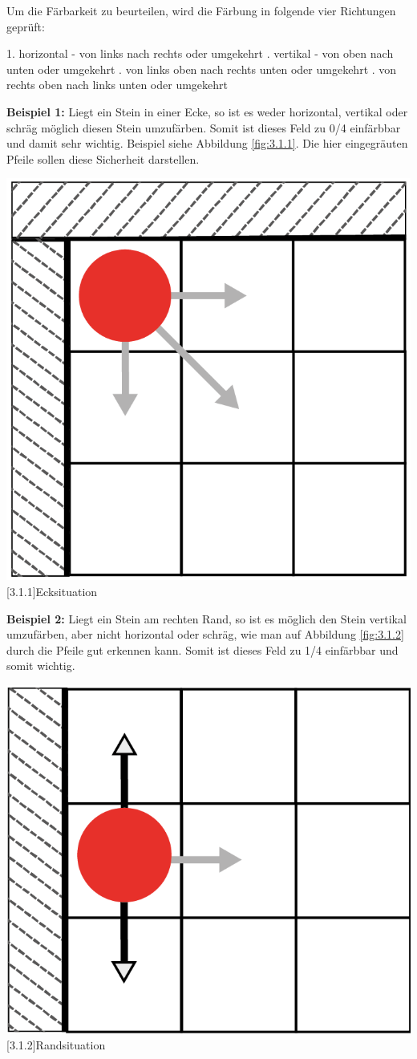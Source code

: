 \documentclass[12pt,a4paper,bibliography=totocnumbered,listof=totocnumbered]{scrartcl}
\begin{document}
    Um die Färbarkeit zu beurteilen, wird die Färbung in folgende vier Richtungen geprüft:

    1. horizontal - von links nach rechts oder umgekehrt . vertikal - von oben nach unten oder umgekehrt . von links oben nach rechts unten oder umgekehrt . von rechts oben nach links unten oder umgekehrt \newline


    \textbf{Beispiel 1:} Liegt ein Stein in einer Ecke, so ist es weder horizontal, vertikal oder schräg möglich diesen Stein umzufärben. Somit ist dieses Feld zu 0/4 einfärbbar und damit sehr wichtig. Beispiel siehe Abbildung \ref{fig:3.1.1}. Die hier eingegräuten Pfeile sollen diese Sicherheit darstellen.

	\vspace{1em}
	\begin{minipage}{\linewidth}
		\centering
		\includegraphics[width=0.33\linewidth]{pics/Kapitel_3/Kapitel_3_pic1.png}
		[3.1.1]{Ecksituation}
		\label{fig:3.1.1}
	\end{minipage}
	\vspace{1em}

    \textbf{Beispiel 2:} Liegt ein Stein am rechten Rand, so ist es möglich den Stein vertikal umzufärben, aber nicht horizontal oder schräg, wie man auf Abbildung \ref{fig:3.1.2} durch die Pfeile gut erkennen kann. Somit ist dieses Feld zu 1/4 einfärbbar und somit wichtig.\newline
    
   	\vspace{1em}
    \begin{minipage}{\linewidth}
    	\centering
    	\includegraphics[width=0.33\linewidth]{pics/Kapitel_3/Kapitel_3_pic2.png}
    	[3.1.2]{Randsituation}
    	\label{fig:3.1.2}
    \end{minipage}
	\vspace{1em}
\end{document}
